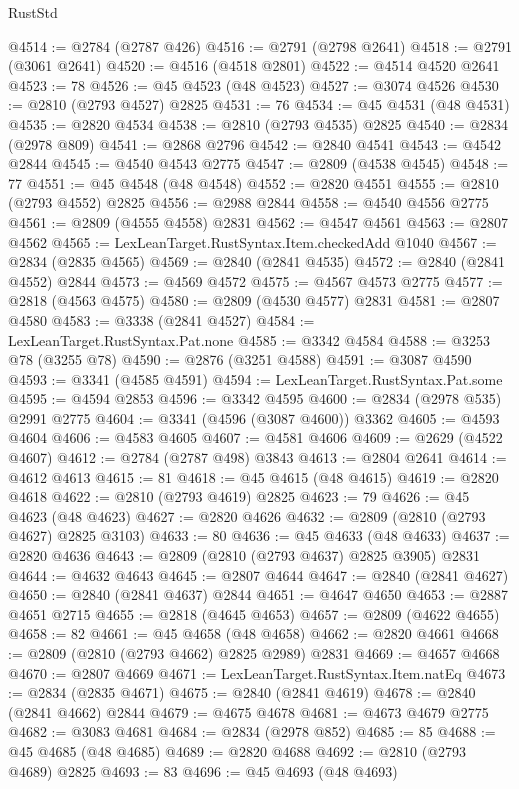 \begin{lexlean}{RustStd}
\begin{coremodule}
@4514 := @2784 (@2787 @426)
@4516 := @2791 (@2798 @2641)
@4518 := @2791 (@3061 @2641)
@4520 := @4516 (@4518 @2801)
@4522 := @4514 @4520 @2641
@4523 := 78
@4526 := @45 @4523 (@48 @4523)
@4527 := @3074 @4526
@4530 := @2810 (@2793 @4527) @2825
@4531 := 76
@4534 := @45 @4531 (@48 @4531)
@4535 := @2820 @4534
@4538 := @2810 (@2793 @4535) @2825
@4540 := @2834 (@2978 @809)
@4541 := @2868 @2796
@4542 := @2840 @4541
@4543 := @4542 @2844
@4545 := @4540 @4543 @2775
@4547 := @2809 (@4538 @4545)
@4548 := 77
@4551 := @45 @4548 (@48 @4548)
@4552 := @2820 @4551
@4555 := @2810 (@2793 @4552) @2825
@4556 := @2988 @2844
@4558 := @4540 @4556 @2775
@4561 := @2809 (@4555 @4558) @2831
@4562 := @4547 @4561
@4563 := @2807 @4562
@4565 := LexLeanTarget.RustSyntax.Item.checkedAdd @1040
@4567 := @2834 (@2835 @4565)
@4569 := @2840 (@2841 @4535)
@4572 := @2840 (@2841 @4552) @2844
@4573 := @4569 @4572
@4575 := @4567 @4573 @2775
@4577 := @2818 (@4563 @4575)
@4580 := @2809 (@4530 @4577) @2831
@4581 := @2807 @4580
@4583 := @3338 (@2841 @4527)
@4584 := LexLeanTarget.RustSyntax.Pat.none
@4585 := @3342 @4584
@4588 := @3253 @78 (@3255 @78)
@4590 := @2876 (@3251 @4588)
@4591 := @3087 @4590
@4593 := @3341 (@4585 @4591)
@4594 := LexLeanTarget.RustSyntax.Pat.some
@4595 := @4594 @2853
@4596 := @3342 @4595
@4600 := @2834 (@2978 @535) @2991 @2775
@4604 := @3341 (@4596 (@3087 @4600)) @3362
@4605 := @4593 @4604
@4606 := @4583 @4605
@4607 := @4581 @4606
@4609 := @2629 (@4522 @4607)
@4612 := @2784 (@2787 @498) @3843
@4613 := @2804 @2641
@4614 := @4612 @4613
@4615 := 81
@4618 := @45 @4615 (@48 @4615)
@4619 := @2820 @4618
@4622 := @2810 (@2793 @4619) @2825
@4623 := 79
@4626 := @45 @4623 (@48 @4623)
@4627 := @2820 @4626
@4632 := @2809 (@2810 (@2793 @4627) @2825 @3103)
@4633 := 80
@4636 := @45 @4633 (@48 @4633)
@4637 := @2820 @4636
@4643 := @2809 (@2810 (@2793 @4637) @2825 @3905) @2831
@4644 := @4632 @4643
@4645 := @2807 @4644
@4647 := @2840 (@2841 @4627)
@4650 := @2840 (@2841 @4637) @2844
@4651 := @4647 @4650
@4653 := @2887 @4651 @2715
@4655 := @2818 (@4645 @4653)
@4657 := @2809 (@4622 @4655)
@4658 := 82
@4661 := @45 @4658 (@48 @4658)
@4662 := @2820 @4661
@4668 := @2809 (@2810 (@2793 @4662) @2825 @2989) @2831
@4669 := @4657 @4668
@4670 := @2807 @4669
@4671 := LexLeanTarget.RustSyntax.Item.natEq
@4673 := @2834 (@2835 @4671)
@4675 := @2840 (@2841 @4619)
@4678 := @2840 (@2841 @4662) @2844
@4679 := @4675 @4678
@4681 := @4673 @4679 @2775
@4682 := @3083 @4681
@4684 := @2834 (@2978 @852)
@4685 := 85
@4688 := @45 @4685 (@48 @4685)
@4689 := @2820 @4688
@4692 := @2810 (@2793 @4689) @2825
@4693 := 83
@4696 := @45 @4693 (@48 @4693)

\end{coremodule}
\end{lexlean}
